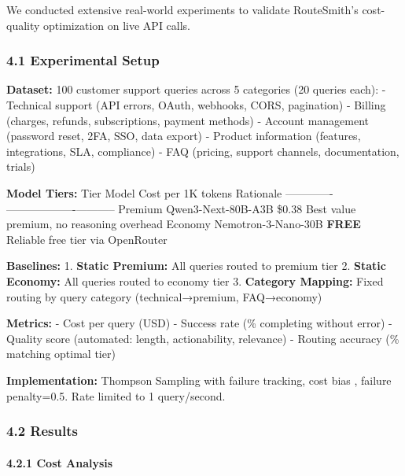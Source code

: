 \documentclass[
  11pt,
]{article}
\begin{document}
We conducted extensive real-world experiments to validate RouteSmith's
cost-quality optimization on live API calls.

\hypertarget{experimental-setup-1}{%
\subsubsection{4.1 Experimental Setup}\label{experimental-setup-1}}

\textbf{Dataset:} 100 customer support queries across 5 categories (20
queries each): - Technical support (API errors, OAuth, webhooks, CORS,
pagination) - Billing (charges, refunds, subscriptions, payment methods)
- Account management (password reset, 2FA, SSO, data export) - Product
information (features, integrations, SLA, compliance) - FAQ (pricing,
support channels, documentation, trials)

\textbf{Model Tiers:} \textbar{} Tier \textbar{} Model \textbar{} Cost
per 1K tokens \textbar{} Rationale \textbar{}
\textbar------\textbar-------\textbar-------------------\textbar-----------\textbar{}
\textbar{} Premium \textbar{} Qwen3-Next-80B-A3B \textbar{} \$0.38
\textbar{} Best value premium, no reasoning overhead \textbar{}
\textbar{} Economy \textbar{} Nemotron-3-Nano-30B \textbar{}
\textbf{FREE} \textbar{} Reliable free tier via OpenRouter \textbar{}

\textbf{Baselines:} 1. \textbf{Static Premium:} All queries routed to
premium tier 2. \textbf{Static Economy:} All queries routed to economy
tier 3. \textbf{Category Mapping:} Fixed routing by query category
(technical→premium, FAQ→economy)

\textbf{Metrics:} - Cost per query (USD) - Success rate (\% completing
without error) - Quality score (automated: length, actionability,
relevance) - Routing accuracy (\% matching optimal tier)

\textbf{Implementation:} Thompson Sampling with failure tracking, cost
bias , failure penalty=0.5. Rate limited to 1 query/second.

\hypertarget{results-1}{%
\subsubsection{4.2 Results}\label{results-1}}

\hypertarget{cost-analysis-1}{%
\paragraph{4.2.1 Cost Analysis}\label{cost-analysis-1}}
\end{document}
